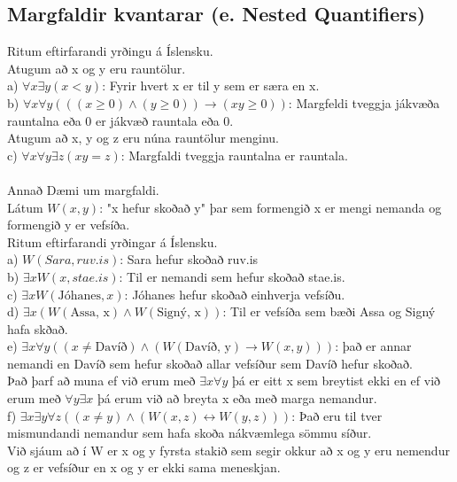 \subsection{Margfaldir kvantarar (e. Nested Quantifiers)}
Ritum eftirfarandi yrðingu á Íslensku.\\
Atugum að x og y eru rauntölur.\\
\indent a) $\forall x \exists y (x < y)$: Fyrir hvert x er til y sem er særa en x.\\
\indent b) $\forall x \forall y (((x \geq 0) \wedge (y \geq 0)) \to (xy \geq 0))$: Margfeldi tveggja jákvæða \indent rauntalna eða 0 er jákvæð rauntala eða 0.\\
Atugum að x, y og z eru núna rauntölur menginu.\\
\indent c) $\forall x \forall y \exists z (xy = z)$: Margfaldi tveggja rauntalna er rauntala.\\
\\
Annað Dæmi um margfaldi.\\
Látum $W(x,y)$: "x hefur skoðað y" þar sem formengið x er mengi nemanda og formengið y er vefsíða.\\
Ritum eftirfarandi yrðingar á Íslensku.\\
\indent a) $W(Sara,ruv.is)$: Sara hefur skoðað ruv.is\\
\indent b) $\exists x W(x, stae.is)$: Til er nemandi sem hefur skoðað stae.is.\\
\indent c) $\exists x W(\text{Jóhanes}, x)$: Jóhanes hefur skoðað einhverja vefsíðu.\\
\indent d) $\exists x (W(\text{Assa, x}) \wedge W(\text{Signý, x}))$: Til er vefsíða sem bæði Assa og Signý hafa \indent skðað.\\
\indent e) $\exists x \forall y((x \not = \text{Davíð}) \wedge (W(\text{Davíð, y}) \to W(x,y)))$: það er annar nemandi en \indent Davíð sem hefur skoðað allar vefsíður sem Davíð hefur skoðað.\\
\indent \indent Það þarf að muna ef við erum með $\exists x \forall y$ þá er eitt x sem breytist ekki en ef \indent \indent við erum með $\forall y \exists x$ þá erum við að breyta x eða með marga nemandur.\\
\indent f) $\exists x \exists y \forall z ((x \not = y) \wedge(W(x,z) \leftrightarrow W(y,z)))$: Það eru til tver mismundandi \indent nemandur sem hafa skoða nákvæmlega sömmu síður.\\
\indent \indent Við sjáum að í W er x og y fyrsta stakið sem segir okkur að x og y eru \indent \indent nemendur og z er vefsíður en x og y er ekki sama meneskjan.\\
\newpage
\setcounter{subsection}{6}
